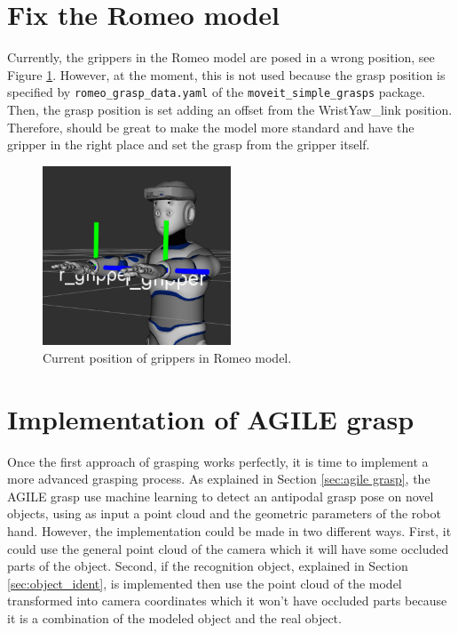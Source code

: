 \documentclass[12pt,a4paper,final,twoside,openright]{report}
\begin{document}
\section{Fix the Romeo model}

Currently, the grippers in the Romeo model are posed in a wrong position, see Figure \ref{fig:gripper_bad_position}. However, at the moment, this is not used because the grasp position is specified by \texttt{romeo\_grasp\_data.yaml} of the \texttt{moveit\_simple\_grasps} package. Then, the grasp position is set adding an offset from the WristYaw\_link position. Therefore, should be great to make the model more standard and have the gripper in the right place and set the grasp from the gripper itself. 

\begin{figure}[h]
\centering
\includegraphics[width=0.5\textwidth]{images/gripper_bad_position.png}
\caption{Current position of grippers in Romeo model.\label{fig:gripper_bad_position}}
\end{figure}

\section{Implementation of AGILE grasp}

Once the first approach of grasping works perfectly, it is time to implement a more advanced grasping process. As explained in Section \ref{sec:agile grasp}, the AGILE grasp use machine learning to detect an antipodal grasp pose on novel objects, using as input a point cloud and the geometric parameters of the robot hand. However, the implementation could be made in two different ways. First, it could use the general point cloud of the camera which it will have some occluded parts of the object. Second, if the recognition object, explained in Section \ref{sec:object_ident}, is implemented then use the point cloud of the model transformed into camera coordinates which it won't have occluded parts because it is a combination of the modeled object and the real object. 
\end{document}

